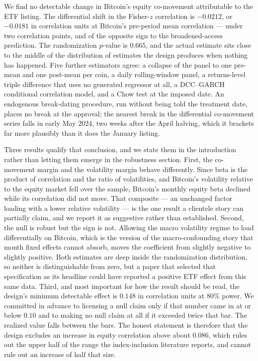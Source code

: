 \documentclass[12pt,a4paper]{article}
\begin{document}
We find no detectable change in Bitcoin's equity co-movement attributable to the ETF listing. The differential shift in the Fisher-$z$ correlation is
$-0.0212$,
or $-0.0181$ in correlation units at Bitcoin's pre-period mean correlation — under two correlation points, and of the opposite sign to the broadened-access prediction.
The randomization $p$-value is $0.665$, and the actual estimate sits close to the middle of the distribution of estimates the design produces when nothing has happened. Five further estimators agree: a collapse of the panel to one pre-mean and one post-mean per coin, a daily rolling-window panel, a returns-level triple difference that uses no generated regressor at all, a DCC--GARCH conditional correlation model, and a Chow test at the imposed date. An endogenous break-dating procedure, run without being told the treatment date, places no break at the approval; the nearest break in the differential co-movement series falls in early May 2024, two weeks after the April halving, which it brackets far more plausibly than it does the January listing.

Three results qualify that conclusion, and we state them in the introduction rather than letting them emerge in the robustness section. First, the co-movement margin and the volatility margin behave differently. Since beta is the product of correlation and the ratio of volatilities, and Bitcoin's volatility relative to the equity market fell over the sample, Bitcoin's monthly equity beta declined while its correlation did not move. That composite — an unchanged factor loading with a lower relative volatility — is the one result a clientele story can partially claim, and we report it as suggestive rather than established. Second, the null is robust but the sign is not. Allowing the macro volatility regime to load differentially on Bitcoin, which is the version of the macro-confounding story that month fixed effects cannot absorb, moves the coefficient from slightly negative to slightly positive. Both estimates are deep inside the randomization distribution, so neither is distinguishable from zero, but a paper that selected that specification as its headline could have reported a positive ETF effect from this same data. Third, and most important for how the result should be read, the design's minimum detectable effect is
$0.148$ in correlation units at 80\% power. We committed in advance to licensing a null claim only if that number came in at or below
$0.10$ and to making no null claim at all if it exceeded twice that bar. The realized value falls between the bars. The honest statement is therefore that the design excludes an increase in equity correlation above about
$0.086$, which rules out the upper half of the range the index-inclusion literature reports, and cannot rule out an increase of half that size.
\end{document}
